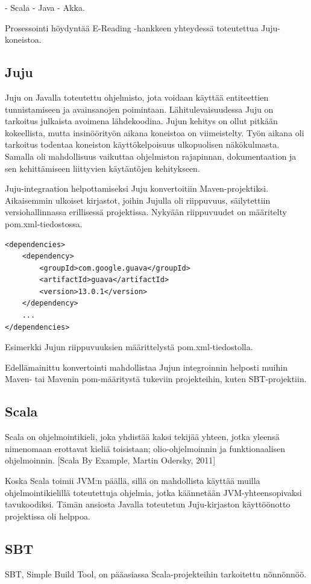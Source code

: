 \documentclass[11pt,a4paper,oneside]{memoir}
\begin{document}
- Scala
- Java
- Akka.

Prosessointi höydyntää E-Reading -hankkeen yhteydessä toteutettua Juju-koneistoa.

\subsection{Juju}
Juju on Javalla toteutettu ohjelmisto, jota voidaan käyttää entiteettien tunnistamiseen ja avainsanojen poimintaan. Lähitulevaisuudessa Juju on tarkoitus julkaista avoimena lähdekoodina. Jujun kehitys on ollut pitkään kokeellista, mutta insinöörityön aikana koneistoa on viimeistelty. Työn aikana oli tarkoitus todentaa koneiston käyttökelpoisuus ulkopuolisen näkökulmasta. Samalla oli mahdollisuus vaikuttaa ohjelmiston rajapinnan, dokumentaation ja sen kehittämiseen liittyvien käytäntöjen kehitykseen.

Juju-integraation helpottamiseksi Juju konvertoitiin Maven-projektiksi. Aikaisemmin ulkoiset kirjastot, joihin Jujulla oli riippuvuus, säilytettiin versiohallinnassa erillisessä projektissa. Nykyään riippuvuudet on määritelty pom.xml-tiedostossa.

\begin{verbatim}
<dependencies>
    <dependency>
        <groupId>com.google.guava</groupId>
        <artifactId>guava</artifactId>
        <version>13.0.1</version>
    </dependency>
    ...
</dependencies>
\end{verbatim}
Esimerkki Jujun riippuvuuksien määrittelystä pom.xml-tiedostolla.

Edellämainittu konvertointi mahdollistaa Jujun integroinnin helposti muihin Maven- tai Mavenin pom-määritystä tukeviin projekteihin, kuten SBT-projektiin.

\subsection{Scala}
Scala on ohjelmointikieli, joka yhdistää kaksi tekijää yhteen, jotka yleensä nimenomaan erottavat kieliä toisistaan; olio-ohjelmoinnin ja funktionaalisen ohjelmoinnin. 
\cite[asd]{scala-by-example}
[Scala By Example, Martin Odersky, 2011]

Koska Scala toimii JVM:n päällä, sillä on mahdollista käyttää muilla ohjelmointikielillä toteutettuja ohjelmia, jotka käännetään JVM-yhteensopivaksi tavukoodiksi. Tämän ansiosta Javalla toteutetun Juju-kirjaston käyttöönotto projektissa oli helppoa.

\subsection{SBT}
SBT, Simple Build Tool, on pääasiassa Scala-projekteihin tarkoitettu nönnönnöö.
\end{document}
